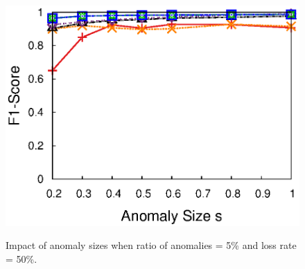 {\begin{figure}[h!]
{{    \includegraphics[width=\figurewidthQ]{fig/dect.AnomalySize.srmf_based_pred.tm_multi_loc_rssi.txt.500.895.1.500.r32.period1.org.2d.elem.ind.elem1.lr0.5.burst1.na0.05.noise0.thresh0.eps}
  }
  }
  \vspace{-0.15in}
  \caption{Impact of anomaly sizes when ratio of anomalies = 5\% and loss rate = 50\%.}
  \vspace{-0.15in}
  \label{fig:anomaly-size-detection}
\end{figure}
}

